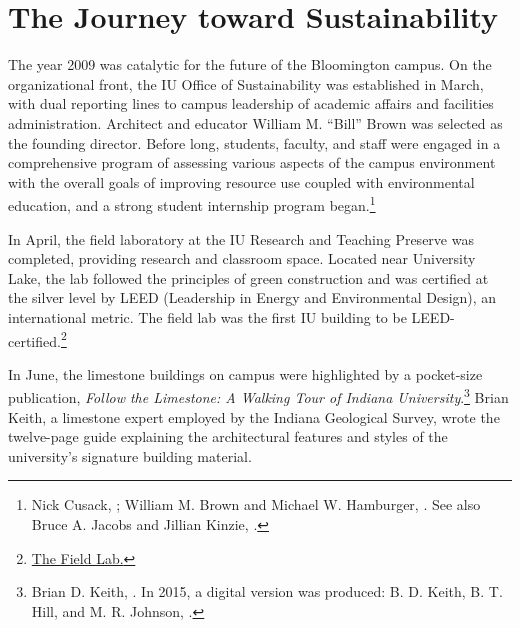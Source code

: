 \documentclass[
  american,
  letterpaper,
]{scrreprt}
\begin{document}
\section{The Journey toward
Sustainability}\label{the-journey-toward-sustainability}

The year 2009 was catalytic for the future of the Bloomington campus. On
the organizational front, the IU Office of Sustainability was
established in March, with dual reporting lines to campus leadership of
academic affairs and facilities administration. Architect and educator
William M. ``Bill'' Brown was selected as the founding director. Before
long, students, faculty, and staff were engaged in a comprehensive
program of assessing various aspects of the campus environment with the
overall goals of improving resource use coupled with environmental
education, and a strong student internship program began.\footnote{Nick
  Cusack, ; William M.
  Brown and Michael W. Hamburger,
  . See also Bruce A. Jacobs and Jillian Kinzie,
  .}

In April, the field laboratory at the IU Research and Teaching Preserve
was completed, providing research and classroom space. Located near
University Lake, the lab followed the principles of green construction
and was certified at the silver level by LEED (Leadership in Energy and
Environmental Design), an international metric. The field lab was the
first IU building to be LEED-certified.\footnote{\href{https://preserve.indiana.edu/about/field-lab.html}{The
  Field Lab.}}

In June, the limestone buildings on campus were highlighted by a
pocket-size publication, \emph{Follow the Limestone: A Walking Tour of
Indiana University}.\footnote{Brian D. Keith,
  . In 2015, a digital version was produced: B. D. Keith, B. T.
  Hill, and M. R. Johnson, .}
Brian Keith, a limestone expert employed by the Indiana Geological
Survey, wrote the twelve-page guide explaining the architectural
features and styles of the university's signature building material.
\end{document}
